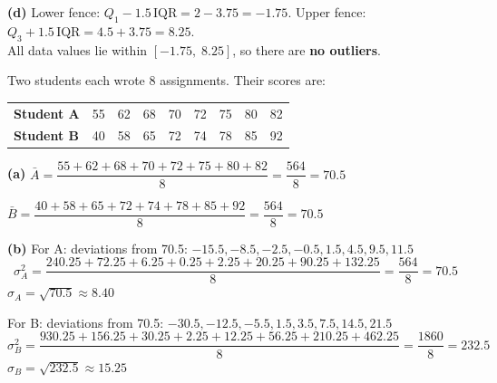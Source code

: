 \documentclass[addpoints]{exam}
\begin{document}
\begin{questions}
\begin{solution}[11cm]
\textbf{(d)} Lower fence: $Q_1 - 1.5\,\text{IQR} = 2 - 3.75 = -1.75$.
Upper fence: $Q_3 + 1.5\,\text{IQR} = 4.5 + 3.75 = 8.25$.\\
All data values lie within $[-1.75,\; 8.25]$, so there are \textbf{no outliers}.
\end{solution}

\question Two students each wrote 8 assignments. Their scores are:

\begin{center}
\begin{tabular}{lcccccccc}
\toprule
\textbf{Student A} & 55 & 62 & 68 & 70 & 72 & 75 & 80 & 82 \\
\textbf{Student B} & 40 & 58 & 65 & 72 & 74 & 78 & 85 & 92 \\
\bottomrule
\end{tabular}
\end{center}

\begin{solution}[9cm]
\textbf{(a)} $\bar{A} = \dfrac{55+62+68+70+72+75+80+82}{8} = \dfrac{564}{8} = \mathbf{70.5}$

$\bar{B} = \dfrac{40+58+65+72+74+78+85+92}{8} = \dfrac{564}{8} = \mathbf{70.5}$

\textbf{(b)} For A: deviations from 70.5: $-15.5, -8.5, -2.5, -0.5, 1.5, 4.5, 9.5, 11.5$
\[
\sigma_A^2 = \frac{240.25 + 72.25 + 6.25 + 0.25 + 2.25 + 20.25 + 90.25 + 132.25}{8}
= \frac{564}{8} = 70.5
\]
$\sigma_A = \sqrt{70.5} \approx \mathbf{8.40}$

For B: deviations from 70.5: $-30.5, -12.5, -5.5, 1.5, 3.5, 7.5, 14.5, 21.5$
\[
\sigma_B^2 = \frac{930.25+156.25+30.25+2.25+12.25+56.25+210.25+462.25}{8}
= \frac{1860}{8} = 232.5
\]
$\sigma_B = \sqrt{232.5} \approx \mathbf{15.25}$


\end{solution}
\end{questions}
\end{document}
